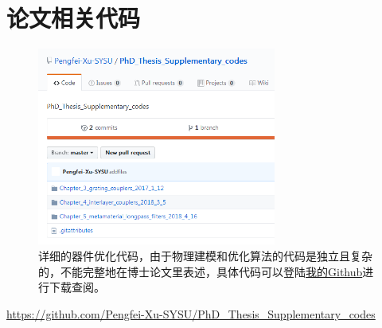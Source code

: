 \chapter{论文相关代码}

\begin{figure}[!htbp]
    \centering
    \includegraphics[width=0.7\textwidth]{Img/6-1.png}
    \caption{详细的器件优化代码，由于物理建模和优化算法的代码是独立且复杂的，不能完整地在博士论文里表述，具体代码可以登陆\href{https://github.com/Pengfei-Xu-SYSU/PhD_Thesis_Supplementary_codes}{我的Github}进行下载查阅。}
    \label{fig:6-1}
\end{figure}

\href{https://github.com/Pengfei-Xu-SYSU/PhD_Thesis_Supplementary_codes}{https://github.com/Pengfei-Xu-SYSU/PhD\_Thesis\_Supplementary\_codes}